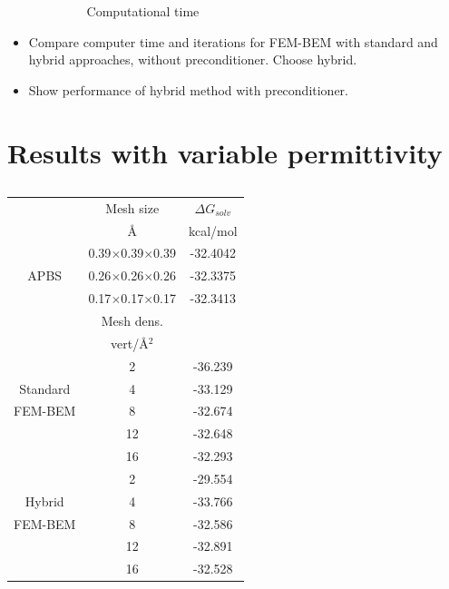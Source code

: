\begin{itemize}
\begin{itemize}
\begin{figure}[!htb]
  \caption{Computational time}
\endminipage
\end{figure}
    \end{itemize}
    \item Compare computer time and iterations for FEM-BEM with standard and hybrid approaches, without preconditioner. Choose hybrid.
    \item Show performance of hybrid method with preconditioner.
\end{itemize}

\section*{\sffamily \Large Results with variable permittivity}

\begin{table}
\centering
\begin{tabular}{c|c|c}
&Mesh size & $\Delta G_{solv}$\\
&\AA       &  kcal/mol \\
\hline
\multirow{3}{*}{APBS}& 0.39$\times$0.39$\times$0.39 & -32.4042\\ 
&0.26$\times$0.26$\times$0.26 & -32.3375\\ 
&0.17$\times$0.17$\times$0.17 & -32.3413\\ 
\hline
&Mesh dens. & \\
&vert/\AA$^2$ & \\
\hline
    & 2 & -36.239\\
Standard    & 4  & -33.129 \\
FEM-BEM    & 8  & -32.674 \\
    & 12 & -32.648 \\
    & 16 & -32.293 \\
\hline
    & 2 & -29.554\\
Hybrid    & 4  & -33.766 \\
FEM-BEM    & 8  & -32.586 \\
    & 12 & -32.891 \\
    & 16 & -32.528 \\
\hline
\end{tabular}
\caption{}
\end{table}

